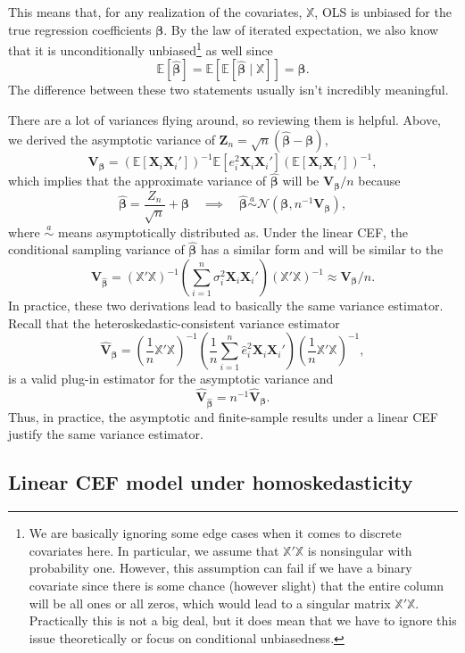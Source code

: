 \documentclass[
  13pt,
  letterpaper,
  DIV=11,
  numbers=noendperiod]{scrreprt}
\newcommand{\mb}{\symbf}
\newcommand{\E}{\mathbb{E}}
\newcommand{\N}{\mathcal{N}}
\newcommand{\X}{\mb{X}}
\newcommand{\Xmat}{\mathbb{X}}
\newcommand{\bfbeta}{\mb{\beta}}
\newcommand{\bhat}{\widehat{\mb{\beta}}}
\theoremstyle{definition}
\theoremstyle{definition}
\theoremstyle{plain}
\theoremstyle{remark}
\begin{document}
This means that, for any realization of the covariates, \(\Xmat\), OLS
is unbiased for the true regression coefficients \(\bfbeta\). By the law
of iterated expectation, we also know that it is unconditionally
unbiased\footnote{We are basically ignoring some edge cases when it
  comes to discrete covariates here. In particular, we assume that
  \(\Xmat'\Xmat\) is nonsingular with probability one. However, this
  assumption can fail if we have a binary covariate since there is some
  chance (however slight) that the entire column will be all ones or all
  zeros, which would lead to a singular matrix \(\Xmat'\Xmat\).
  Practically this is not a big deal, but it does mean that we have to
  ignore this issue theoretically or focus on conditional unbiasedness.}
as well since \[
\E[\bhat] = \E[\E[\bhat \mid \Xmat]] = \bfbeta. 
\] The difference between these two statements usually isn't incredibly
meaningful.

There are a lot of variances flying around, so reviewing them is
helpful. Above, we derived the asymptotic variance of
\(\mb{Z}_{n} = \sqrt{n}(\bhat - \bfbeta)\), \[
\mb{V}_{\bfbeta} = \left( \E[\X_i\X_i'] \right)^{-1}\E[e_i^2\X_i\X_i']\left( \E[\X_i\X_i'] \right)^{-1},
\] which implies that the approximate variance of \(\bhat\) will be
\(\mb{V}_{\bfbeta} / n\) because \[
\bhat = \frac{Z_n}{\sqrt{n}} + \bfbeta \quad\implies\quad \bhat \overset{a}{\sim} \N(\bfbeta, n^{-1}\mb{V}_{\bfbeta}),
\] where \(\overset{a}{\sim}\) means asymptotically distributed as.
Under the linear CEF, the conditional sampling variance of \(\bhat\) has
a similar form and will be similar to the\\
\[
\mb{V}_{\bhat} = \left( \Xmat'\Xmat \right)^{-1}\left( \sum_{i=1}^n \sigma^2_i \X_i\X_i' \right) \left( \Xmat'\Xmat \right)^{-1} \approx \mb{V}_{\bfbeta} / n.
\] In practice, these two derivations lead to basically the same
variance estimator. Recall that the heteroskedastic-consistent variance
estimator \[
\widehat{\mb{V}}_{\bfbeta} = \left( \frac{1}{n} \Xmat'\Xmat \right)^{-1} \left( \frac{1}{n} \sum_{i=1}^n\widehat{e}_i^2\X_i\X_i' \right) \left( \frac{1}{n} \Xmat'\Xmat \right)^{-1},
\] is a valid plug-in estimator for the asymptotic variance and \[
\widehat{\mb{V}}_{\bhat} = n^{-1}\widehat{\mb{V}}_{\bfbeta}.
\] Thus, in practice, the asymptotic and finite-sample results under a
linear CEF justify the same variance estimator.

\subsection{Linear CEF model under
homoskedasticity}\label{linear-cef-model-under-homoskedasticity}
\end{document}
